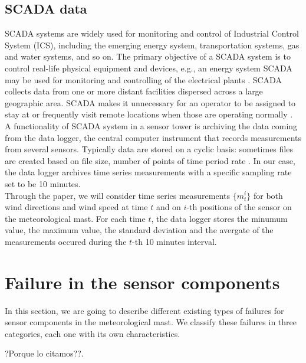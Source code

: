 \documentclass[journal]{IEEEtran}
\begin{document}
\subsection{SCADA data}\label{subsec:scadaData}
SCADA systems are widely used for monitoring and control of Industrial Control System (ICS), including the emerging energy system, transportation systems, gas and water systems, and so on. The primary objective of a SCADA system is to control real-life physical equipment and devices, e.g., an energy system SCADA may be used for monitoring and controlling of the electrical plants \cite{ahmed2015investigation}. SCADA collects data from one or more distant facilities dispersed across a large geographic area. SCADA makes it unnecessary for an operator to be assigned to stay at or frequently visit remote locations when those are operating normally \cite{boyer2009scada}. \\
A functionality of SCADA system in a sensor tower is archiving the data coming from the data logger, the central computer instrument that records measurements from several sensors. Typically data are stored  on a cyclic basis: sometimes files are created based on file size, number of points of time period rate \cite{daneels1999scada}. In our case, the data logger archives time series measurements with a specific sampling rate set to be 10 minutes. \\
Through the paper, we will consider time series measurements $\{m_t^i\}$ for both wind directions and wind speed at time $t$ and on $i$-th positions of the sensor on the meteorological mast. For each time $t$, the data logger stores the minumum value, the maximum value, the standard deviation and the avergate of the measurements occured during the $t$-th 10 minutes interval.

\section{Failure in the sensor components}\label{sec:failures}
In this section, we are going to describe different existing types of failures for sensor components in the meteorological mast. We classify these failures in three categories, each one with its own characteristics.


?Porque lo citamos??\cite{chandola2009anomaly}.
\end{document}
